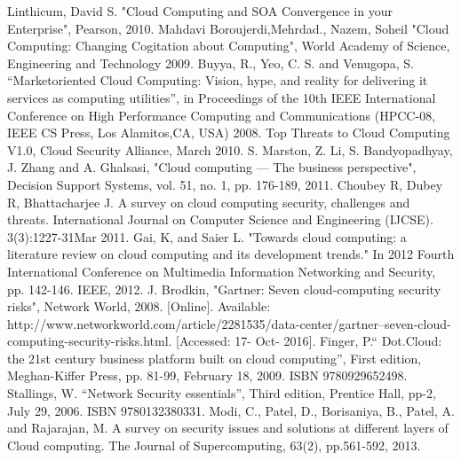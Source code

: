 \documentclass[10pt,journal,compsoc]{IEEEtran}
\begin{document}
\begin{thebibliography}{1}
\bibitem{}
 Linthicum, David S. "Cloud Computing and SOA Convergence in your Enterprise", Pearson, 2010.
\vspace{5mm}
\bibitem{}
Mahdavi Boroujerdi,Mehrdad., Nazem, Soheil "Cloud Computing: Changing Cogitation about Computing", World Academy of Science, Engineering and Technology 2009.
\vspace{5mm}
\bibitem{}
Buyya, R.,  Yeo, C. S.  and Venugopa, S. “Marketoriented Cloud Computing: Vision, hype, and reality for delivering it services as computing utilities”, in Proceedings of the 10th IEEE International Conference on High Performance Computing and Communications (HPCC-08, IEEE CS Press, Los Alamitos,CA, USA) 2008.
\vspace{5mm}
\bibitem{}
Top Threats to Cloud Computing V1.0, Cloud Security Alliance, March 2010.
\vspace{5mm}
\bibitem{}
S. Marston, Z. Li, S. Bandyopadhyay, J. Zhang and A. Ghalsasi, "Cloud computing — The business perspective", Decision Support Systems, vol. 51, no. 1, pp. 176-189, 2011.
\vspace{5mm}
\bibitem{}
Choubey R, Dubey R, Bhattacharjee J. A survey on cloud computing security, challenges and threats. International Journal on Computer Science and Engineering (IJCSE). 3(3):1227-31Mar 2011.
\vspace{5mm}
\bibitem{}
Gai, K, and Saier L. "Towards cloud computing: a literature review on cloud computing and its development trends." In 2012 Fourth International Conference on Multimedia Information Networking and Security, pp. 142-146. IEEE, 2012.
\vspace{5mm}
\bibitem{}
J. Brodkin, "Gartner: Seven cloud-computing security risks", Network World, 2008. [Online]. Available: http://www.networkworld.com/article/2281535/data-center/gartner--seven-cloud-computing-security-risks.html. [Accessed: 17- Oct- 2016].
\vspace{5mm}
\bibitem{}
Finger, P.“ Dot.Cloud: the 21st century business platform built on cloud computing”, First edition, Meghan-Kiffer Press, pp. 81-99, February 18, 2009. ISBN 9780929652498.
\vspace{5mm}
\bibitem{}
Stallings, W. “Network Security essentials”, Third edition, Prentice Hall, pp-2, July 29, 2006. ISBN 9780132380331. 
\vspace{5mm}
\bibitem{}
Modi, C., Patel, D., Borisaniya, B., Patel, A. and Rajarajan, M. A survey on security issues and solutions at different layers of Cloud computing. The Journal of Supercomputing, 63(2), pp.561-592, 2013.

\end{thebibliography}
\end{document}
